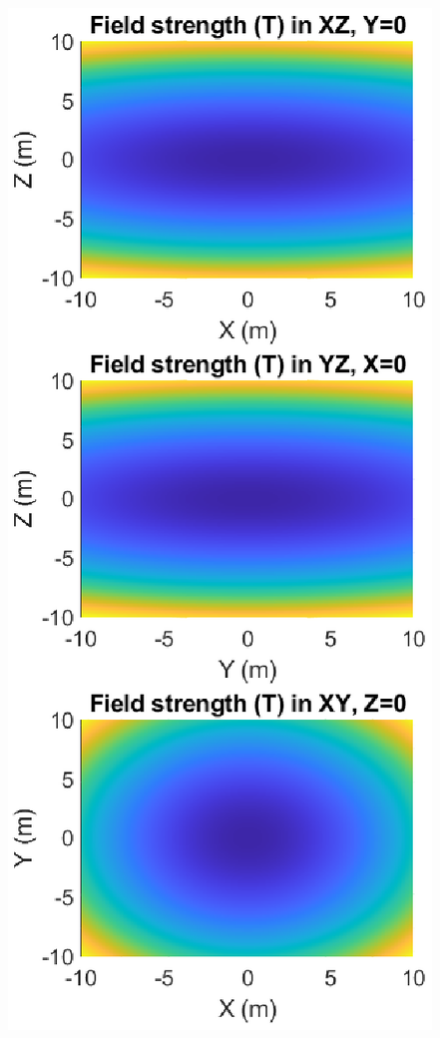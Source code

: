 \documentclass{book}
\theoremstyle{definition}
\begin{document}
\begin{figure}[!htb]
\begin{minipage}{.49\textwidth}
		\includegraphics[width=\linewidth]{sim-figs/TOP-1.eps}

\end{minipage}
\end{figure}
\end{document}
